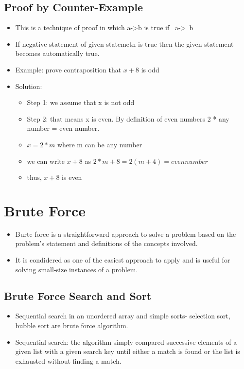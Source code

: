 \documentclass{article}
\begin{document}
\subsection{Proof by Counter-Example}
\begin{itemize}
	\item This is a technique of proof in which a->b is true if ~a->~b
	\item If negative statement of given statemetn is true then the given statement becomes automatically true.
	\item Example: prove contraposition that $ x + 8$ is odd
	\item Solution:
		\begin{itemize}
			\item Step 1: we assume that x is not odd
			\item Step 2: that means x is even. By definition of even numbers 2 * any number = even number.
			\item $ x = 2 * m$ 		where m can be any number
			\item we can write $ x+ 8$ as $ 2*m+8=2(m+4)= even number$
			\item thus, $ x + 8$ is even 
		\end{itemize}
\end{itemize}
\section{Brute Force}
\begin{itemize}
	\item Burte force is a straightforward approach to solve a problem based on the problem's statement and definitions of the concepts involved.
	\item It is condidered as one of the easiest approach to apply and is useful for solving small-size instances of a problem.
\end{itemize}
\subsection{Brute Force Search and Sort}
\begin{itemize}
	\item Sequential search in an unordered array and simple sorts- selection sort, bubble sort are brute force algorithm.
	\item Sequential search: the algorithm simply compared successive elements of a given list with a given search key until either a match is found or the list is exhausted without finding a match.
\end{itemize}
\end{document}

